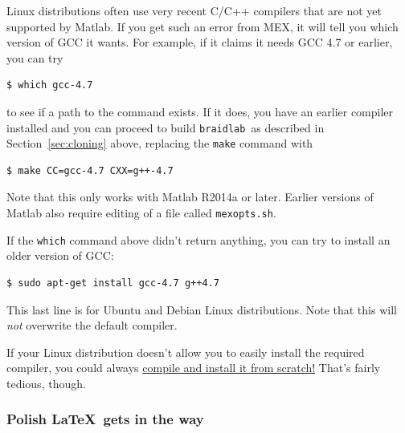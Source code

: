\documentclass[12pt]{article}
\newcommand{\braidlab}{\texttt{braidlab}}%
\begin{document}
Linux distributions often use very recent C/C++ compilers that are not yet
supported by Matlab.  If you get such an error from MEX, it will tell you
which version of GCC it wants.  For example, if it claims it needs GCC 4.7 or
earlier, you can try
\begin{lstlisting}[frame=single,framerule=0pt,escapechar=*,%
  language=bash,backgroundcolor=\color{white}]
$ which gcc-4.7
\end{lstlisting}
to see if a path to the command exists.  If it does, you have an earlier
compiler installed and you can proceed to build \braidlab\ as described in
Section~\ref{sec:cloning} above, replacing the \lstinline{make} command with
\begin{lstlisting}[frame=single,framerule=0pt,escapechar=*,%
  language=bash,backgroundcolor=\color{white}]
$ make CC=gcc-4.7 CXX=g++-4.7
\end{lstlisting}
Note that this only works with Matlab R2014a or later.  Earlier versions of
Matlab also require editing of a file called \lstinline{mexopts.sh}.

If the \lstinline{which} command above didn't return anything, you can try to
install an older version of GCC:
\begin{lstlisting}[frame=single,framerule=0pt,escapechar=*,%
  language=bash,backgroundcolor=\color{white}]
$ sudo apt-get install gcc-4.7 g++4.7
\end{lstlisting}
This last line is for Ubuntu and Debian Linux distributions.  Note that this
will \emph{not} overwrite the default compiler.

If your Linux distribution doesn't allow you to easily install the required
compiler, you could always \href{https://gcc.gnu.org/releases.html}{compile
  and install it from scratch!}  That's fairly tedious, though.


\subsubsection{Polish \LaTeX\ gets in the way}
\end{document}
